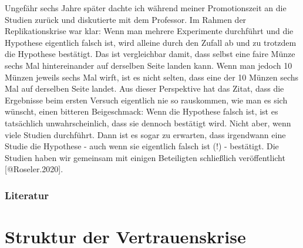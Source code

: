 \documentclass[
  letterpaper,
  DIV=11,
  numbers=noendperiod]{scrreprt}
\begin{document}
\begin{tcolorbox}
Ungefähr sechs Jahre später dachte ich während meiner Promotionszeit an
die Studien zurück und diskutierte mit dem Professor. Im Rahmen der
Replikationskrise war klar: Wenn man mehrere Experimente durchführt und
die Hypothese eigentlich falsch ist, wird alleine durch den Zufall ab
und zu trotzdem die Hypothese bestätigt. Das ist vergleichbar damit,
dass selbst eine faire Münze sechs Mal hintereinander auf derselben
Seite landen kann. Wenn man jedoch 10 Münzen jeweils sechs Mal wirft,
ist es nicht selten, dass eine der 10 Münzen sechs Mal auf derselben
Seite landet. Aus dieser Perspektive hat das Zitat, dass die Ergebnisse
beim ersten Versuch eigentlich nie so rauskommen, wie man es sich
wünscht, einen bitteren Beigeschmack: Wenn die Hypothese falsch ist, ist
es tatsächlich unwahrscheinlich, dass sie dennoch bestätigt wird. Nicht
aber, wenn viele Studien durchführt. Dann ist es sogar zu erwarten, dass
irgendwann eine Studie die Hypothese - auch wenn sie eigentlich falsch
ist (!) - bestätigt. Die Studien haben wir gemeinsam mit einigen
Beteiligten schließlich veröffentlicht {[}@Roseler.2020{]}.

\end{tcolorbox}

\subsection{Literatur}\label{literatur-4}

\chapter{Struktur der
Vertrauenskrise}\label{struktur-der-vertrauenskrise}
\end{document}
